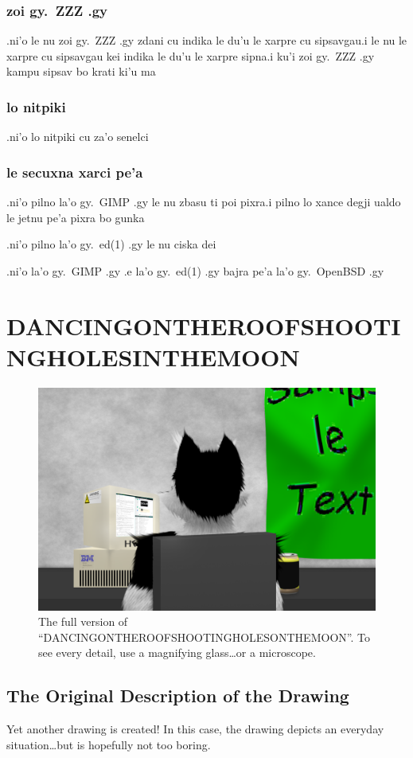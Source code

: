 \documentclass{report}
\begin{document}
\subsection{zoi gy.\ ZZZ .gy}
.ni'o le nu zoi gy.\ ZZZ .gy zdani cu indika le du'u le xarpre cu sipsavgau\@  .i le nu le xarpre cu sipsavgau kei indika le du'u le xarpre sipna\@  .i ku'i zoi gy.\ ZZZ .gy kampu sipsav bo krati ki'u ma
\subsection{lo nitpiki}
.ni'o lo nitpiki cu za'o senelci
\subsection{le secuxna xarci pe'a}
.ni'o pilno la'o gy.\ GIMP .gy le nu zbasu ti poi pixra\@  .i pilno lo xance degji ualdo le jetnu pe'a pixra bo gunka

.ni'o pilno la'o gy.\ ed(1) .gy le nu ciska dei

.ni'o la'o gy.\ GIMP .gy .e la'o gy.\ ed(1) .gy bajra pe'a la'o gy.\ OpenBSD .gy
\chapter{DANCINGONTHEROOFSHOOTINGHOLESINTHEMOON}
\begin{figure}[ht]
	\centering
	\includegraphics[width=\textwidth]{dancingontheroofshootingholesinthemoon/dancingontheroofshootingholesinthemoon.png}
\caption[center]{The full version of ``DANCINGONTHEROOFSHOOTINGHOLESONTHEMOON''.  To see every detail, use a magnifying glass\ldots or a microscope.}
\end{figure}
\section{The Original Description of the Drawing}
Yet another drawing is created!
In this case, the drawing depicts an everyday situation\ldots but is hopefully not too boring.
\end{document}
